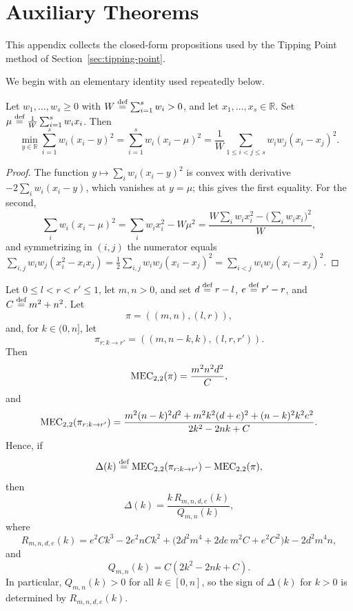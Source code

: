 \section{Auxiliary Theorems}
\label{appendix:auxiliary-theorems}

This appendix collects the closed-form propositions used by the Tipping Point method of Section~\ref{sec:tipping-point}.

We begin with an elementary identity used repeatedly below.

\begin{lemma}\label{lem:weighted-variance}
Let \(w_1,\dots,w_s\geq 0\) with \(W\stackrel{\text{def}}{=}\sum_{i=1}^s w_i>0\), and let \(x_1,\dots,x_s\in\mathbb{R}\). Set \(\mu\stackrel{\text{def}}{=}\frac{1}{W}\sum_{i=1}^s w_ix_i\). Then
\[
\min_{y\in\mathbb{R}}\sum_{i=1}^s w_i(x_i-y)^2
=\sum_{i=1}^s w_i(x_i-\mu)^2
=\frac{1}{W}\sum_{1\leq i<j\leq s}w_iw_j(x_i-x_j)^2.
\]
\end{lemma}
\begin{proof}
The function \(y\mapsto\sum_i w_i(x_i-y)^2\) is convex with derivative \(-2\sum_i w_i(x_i-y)\), which vanishes at \(y=\mu\); this gives the first equality. For the second,
\[
\sum_i w_i(x_i-\mu)^2
=\sum_i w_ix_i^2-W\mu^2
=\frac{W\sum_i w_ix_i^2-\bigl(\sum_i w_ix_i\bigr)^2}{W},
\]
and symmetrizing in \((i,j)\) the numerator equals
\(\sum_{i,j}w_iw_j(x_i^2-x_ix_j)=\tfrac12\sum_{i,j}w_iw_j(x_i-x_j)^2=\sum_{i<j}w_iw_j(x_i-x_j)^2\).
\end{proof}

\begin{proposition}
\label{prop:mec-general-mass-shift-formulas}
Let \(0\le l<r<r'\le 1\), let \(m,n>0\), and set \(d\stackrel{\text{def}}{=} r-l\), \(e\stackrel{\text{def}}{=} r'-r\), and \(C\stackrel{\text{def}}{=} m^2+n^2\). Let
\[
\pi=((m,n),(l,r)),
\]
and, for \(k\in(0,n]\), let
\[
\pi_{r:k\rightarrow r'}=((m,n-k,k),(l,r,r')).
\]
Then
\[
\MEC[2,2](\pi)=\frac{m^2n^2d^2}{C},
\]
and
\[
\MEC[2,2](\pi_{r:k\rightarrow r'})
=
\frac{
m^2(n-k)^2d^2+m^2k^2(d+e)^2+(n-k)^2k^2e^2
}{
2k^2-2nk+C
}.
\]
Hence, if
\[
\Delta(k)\defsymbol \MEC[2,2](\pi_{r:k\rightarrow r'})-\MEC[2,2](\pi),
\]
then
\[
\Delta(k)=\frac{k\,R_{m,n,d,e}(k)}{Q_{m,n}(k)},
\]
where
\[
R_{m,n,d,e}(k)
=
e^2Ck^3-2e^2nCk^2+\bigl(2d^2m^4+2de\,m^2C+e^2C^2\bigr)k-2d^2m^4n,
\]
and
\[
Q_{m,n}(k)=C(2k^2-2nk+C).
\]
In particular, \(Q_{m,n}(k)>0\) for all \(k\in[0,n]\), so the sign of \(\Delta(k)\) for \(k>0\) is determined by \(R_{m,n,d,e}(k)\).
\end{proposition}

